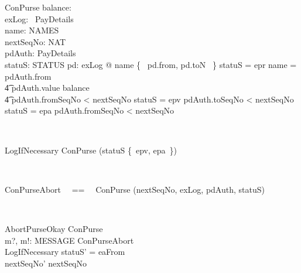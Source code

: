 \begin{LSDef}
\begin{schema}{ConPurse}
   balance: \nat \\
   exLog: \power~PayDetails \\
   name: NAMES \\
   nextSeqNo: NAT \\
   pdAuth: PayDetails \\
   statuS: STATUS
\where
   \forall pd: exLog @ name \in \{~ pd.from, pd.toN ~\}
   \also
   statuS = epr \implies name = pdAuth.from \\
                \t4 \land pdAuth.value \leq balance \\
                \t4 \land pdAuth.fromSeqNo < nextSeqNo
   \also
   statuS = epv \implies pdAuth.toSeqNo < nextSeqNo
   \also
   statuS = epa \implies pdAuth.fromSeqNo < nextSeqNo
\end{schema}~\end{LSDef}

\begin{LSDef}
\begin{schema}{LogIfNecessary}
   \Delta ConPurse
\where
   \IF (statuS \in \{~epv, epa~\}) \THEN
   		[|exLog' = exLog \cup \{~pdAuth~\}]
   \ELSE
   		[|exLog' = exLog \cup \emptyset]
\end{schema}~\end{LSDef}

\begin{LSDef}
\begin{zed}
   ConPurseAbort ~~==~~ ConPurse \hide (nextSeqNo, exLog, pdAuth, statuS)
\end{zed}~\end{LSDef}

\begin{LSDef}
\begin{schema}{AbortPurseOkay}
   \Delta ConPurse \\
   m?, m!: MESSAGE
\where
  \Xi ConPurseAbort \\
  LogIfNecessary
  \also
  statuS' = eaFrom \\
  nextSeqNo' \geq nextSeqNo \\
\end{schema}~\end{LSDef}

